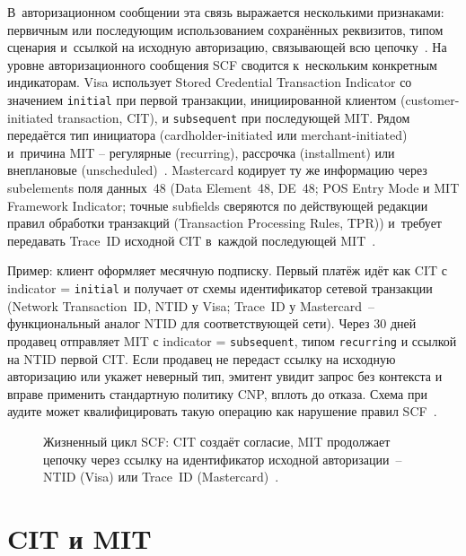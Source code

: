 В~авторизационном сообщении эта связь выражается несколькими
признаками: первичным или последующим использованием сохранённых
реквизитов, типом сценария и~ссылкой на исходную авторизацию, связывающей
всю цепочку~\cite{mc-tpr,cybs-initial-transactions}.
На уровне авторизационного сообщения SCF сводится к~нескольким
конкретным индикаторам. Visa использует Stored Credential
Transaction Indicator со значением \texttt{initial} при первой
транзакции, инициированной клиентом (customer-initiated transaction, CIT),
и \texttt{subsequent} при последующей MIT. Рядом передаётся
тип инициатора (cardholder-initiated или merchant-initiated)
и~причина MIT -- регулярные (recurring), рассрочка (installment) или
внеплановые (unscheduled)~\cite{visa-scf,cybs-initial-transactions}. Mastercard
кодирует ту же информацию через subelements поля данных~48 (Data Element~48, DE~48; POS Entry
Mode и MIT Framework Indicator; точные subfields сверяются
по действующей редакции правил обработки транзакций (Transaction Processing Rules, TPR)) и~требует передавать Trace~ID
исходной CIT в~каждой последующей MIT~\cite{mc-tpr}.

Пример: клиент оформляет месячную подписку. Первый платёж идёт
как CIT с indicator = \texttt{initial} и
получает от схемы идентификатор сетевой транзакции
(Network Transaction~ID, NTID у Visa; Trace~ID у Mastercard~--
функциональный аналог NTID для соответствующей сети). Через 30 дней продавец отправляет MIT с
indicator = \texttt{subsequent}, типом \texttt{recurring} и
ссылкой на NTID первой CIT. Если продавец не передаст ссылку
на исходную авторизацию или укажет неверный тип, эмитент увидит
запрос без контекста и вправе применить стандартную политику CNP,
вплоть до отказа. Схема при аудите может квалифицировать такую
операцию как нарушение правил SCF~\cite{mc-tpr,visa-core-rules}.

\begin{figure}[tbp]
  \centering
  \caption{Жизненный цикл SCF: CIT создаёт согласие, MIT продолжает
  цепочку через ссылку на идентификатор исходной авторизации~--
  NTID (Visa) или Trace~ID (Mastercard)~\cite{mrc-nti-trace-id}.}\label{fig:scf-lifecycle}
\end{figure}

\section{CIT и MIT}\label{sec:subscriptions-cit-mit}

